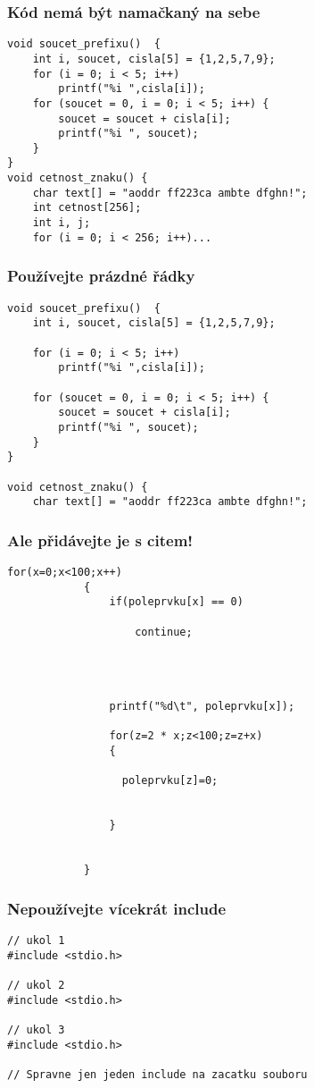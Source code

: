 \documentclass{beamer}
\begin{document}
\begin{frame}[t,fragile]\frametitle{Kód nemá být namačkaný na sebe} 
\begin{verbatim} 
void soucet_prefixu()  {
    int i, soucet, cisla[5] = {1,2,5,7,9};
    for (i = 0; i < 5; i++)
        printf("%i ",cisla[i]);
    for (soucet = 0, i = 0; i < 5; i++) {
        soucet = soucet + cisla[i];
        printf("%i ", soucet);
    }
}
void cetnost_znaku() {
    char text[] = "aoddr ff223ca ambte dfghn!";
    int cetnost[256];
    int i, j;
    for (i = 0; i < 256; i++)... 
\end{verbatim}
\end{frame}


\begin{frame}[t,fragile]\frametitle{Používejte prázdné řádky} 
\begin{verbatim} 
void soucet_prefixu()  {
    int i, soucet, cisla[5] = {1,2,5,7,9};

    for (i = 0; i < 5; i++)
        printf("%i ",cisla[i]);

    for (soucet = 0, i = 0; i < 5; i++) {
        soucet = soucet + cisla[i];
        printf("%i ", soucet);
    }
}

void cetnost_znaku() {
    char text[] = "aoddr ff223ca ambte dfghn!";
\end{verbatim}
\end{frame}


\begin{frame}[t,fragile]\frametitle{Ale přidávejte je s citem!} 
\begin{verbatim} 
for(x=0;x<100;x++)
            {
                if(poleprvku[x] == 0)

                    continue;




                printf("%d\t", poleprvku[x]);

                for(z=2 * x;z<100;z=z+x)
                {

                  poleprvku[z]=0;


                }


            }
\end{verbatim}
\end{frame}


\begin{frame}[t,fragile]\frametitle{Nepoužívejte vícekrát include} 
\begin{verbatim} 
// ukol 1
#include <stdio.h>

// ukol 2
#include <stdio.h>

// ukol 3
#include <stdio.h>

// Spravne jen jeden include na zacatku souboru
\end{verbatim}
\end{frame}
\end{document}
